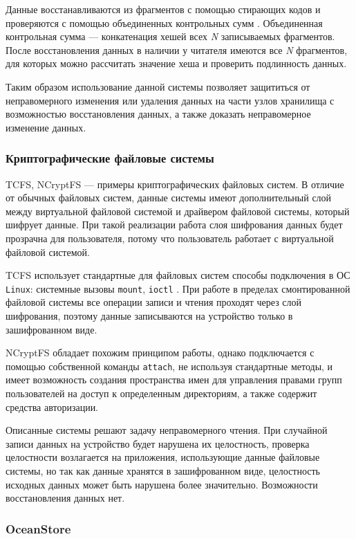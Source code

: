 Данные восстанавливаются из фрагментов с помощью стирающих кодов \cite{erasurecode} и проверяются с помощью объединенных контрольных сумм \cite{pasis}. Объединенная контрольная сумма --- конкатенация хешей всех \textit{N} записываемых фрагментов. После восстановления данных в наличии у читателя имеются все \textit{N} фрагментов, для которых можно рассчитать значение хеша и проверить подлинность данных.

Таким образом использование данной системы позволяет защититься от неправомерного изменения или удаления данных на части узлов хранилища с возможностью восстановления данных, а также доказать неправомерное изменение данных.

\subsubsection{Криптографические файловые системы}

TCFS\cite{tcfs}, NCryptFS\cite{ncryptfs} --- примеры криптографических файловых систем. В отличие от обычных файловых систем, данные системы имеют дополнительный слой между виртуальной файловой системой и драйвером файловой системы, который шифрует данные. При такой реализации работа слоя шифрования данных будет прозрачна для пользователя, потому что пользователь работает с виртуальной файловой системой.

TCFS использует стандартные для файловых систем способы подключения в ОС \texttt{Linux}: системные вызовы \texttt{mount}, \texttt{ioctl} \cite{linux}. При работе в пределах смонтированной файловой системы все операции записи и чтения проходят через слой шифрования, поэтому данные записываются на устройство только в зашифрованном виде.

NCryptFS обладает похожим принципом работы, однако подключается с помощью собственной команды \texttt{attach}, не используя стандартные методы, и имеет возможность создания пространства имен для управления правами групп пользователей на доступ к определенным директориям, а также содержит средства авторизации.

Описанные системы решают задачу неправомерного чтения. При случайной записи данных на устройство будет нарушена их целостность, проверка целостности возлагается на приложения, использующие данные файловые системы, но так как данные хранятся в зашифрованном виде, целостность исходных данных может быть нарушена более значительно. Возможности восстановления данных нет.

\subsubsection{OceanStore}
\label{par:ocean}

